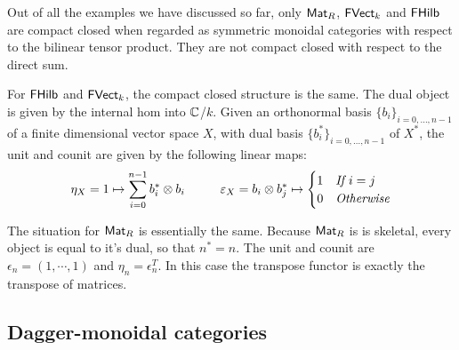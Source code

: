 \begin{example}
Out of all the examples we have discussed so far, only $\Mat_R$, $\FVect_k$ and $\FHilb$ are compact closed when regarded as symmetric monoidal categories with respect to the bilinear tensor product.  They are not compact closed with respect to the direct sum.

For $\FHilb$ and $\FVect_k$, the compact closed structure is the same.  The dual object is given by the internal hom into $\C$/$k$.  Given an orthonormal basis $\{ b_i \}_{i=0,\ldots, n-1}$ of a finite dimensional vector space $X$, with dual basis $\{b_i^* \}_{i=0,\ldots, n-1}$ of $X^*$, the unit and counit are given by the following linear maps:
$$
\eta_X = 1 \mapsto \sum_{i=0}^{n-1} b_i^* \otimes b_i \hspace*{1cm}\epsilon_X = b_i\otimes b_j^* \mapsto 
\begin{cases}
1 & \textit{If $i=j$}\\
0 & \textit{Otherwise}
\end{cases}
$$

The situation for $\Mat_R$ is essentially the same.
Because $\Mat_R$ is is skeletal, every object is equal to it's dual, so that $n^*=n$.
The unit and counit are $\epsilon_n=(1,\cdots, 1)$ and  $\eta_n=\epsilon_n^T$.  In this case the transpose functor is exactly the transpose of matrices. 
\end{example}






\subsection{Dagger-monoidal categories}
\label{subsec:dag}

